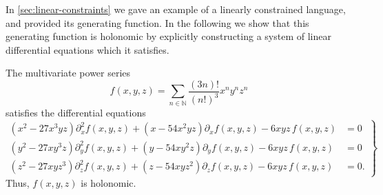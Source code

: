 In \cref{sec:linear-constraints} we gave an example of a linearly constrained language, and provided its generating function.
In the following we show that this generating function is holonomic by explicitly constructing a system of linear differential equations which it satisfies.

\begin{proposition}\label{prop:appendix/holonomic-function}
	The multivariate power series
	\[
		f(x,y,z) =
		\sum_{n \in \mathbb{N}}
		\frac{(3n)!}{(n!)^3}
		x^n y^n z^n
	\]
	satisfies the differential equations
	\begin{equation}\label{eq:appendix/holonomic-differential-eq}
	\left.
	\begin{aligned}
		(x^2 - 27 x^3 y z) \partial_x^2 f(x,y,z)
		+ (x - 54 x^2 y z) \partial_x f(x,y,z)
		- 6 x y z \, f(x,y,z)
		&= 0
		\\
		(y^2 - 27 x y^3 z) \partial_y^2 f(x,y,z)
		+ (y - 54 x y^2 z) \partial_y f(x,y,z)
		- 6 x y z \, f(x,y,z)
		&= 0
		\\
		(z^2 - 27 x y z^3) \partial_z^2 f(x,y,z)
		+ (z - 54 x y z^2) \partial_z f(x,y,z)
		- 6 x y z \, f(x,y,z)
		&= 0.
	\end{aligned}
	\right\}
	\end{equation}
	Thus, $f(x,y,z)$ is holonomic.
\end{proposition}

